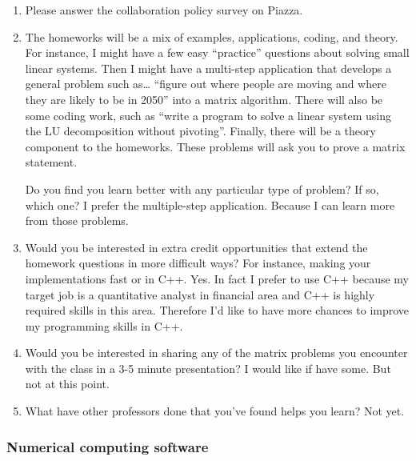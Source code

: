 \documentclass{article}
\begin{document}
\begin{enumerate}%
\item Please answer the collaboration policy survey on Piazza.


\item The homeworks will be a mix of examples, applications, coding, and theory. For instance, I might have a few easy ``{}practice''{} questions about solving small linear systems. Then I might have a multi-step application that develops a general problem such as\ldots{} ``{}figure out where people are moving and where they are likely to be in 2050''{} into a matrix algorithm. There will also be some coding work, such as ``{}write a program to solve a linear system using the LU decomposition without pivoting''{}. Finally, there will be a theory component to the homeworks. These problems will ask you to prove a matrix statement.

Do you find you learn better with any particular type of problem? If so, which one?
I prefer the multiple-step application. Because I can learn more from those problems. 

\item Would you be interested in extra credit opportunities that extend the homework questions in more difficult ways? For instance, making your implementations fast or in C++.
Yes.  In fact I prefer to use C++ because my target job is a quantitative analyst in financial area and C++ is highly required skills in this area.  Therefore I'd like to have more chances to improve my programming skills in C++. 



\item Would you be interested in sharing any of the matrix problems you encounter with the class in a 3-5 minute presentation?
I would like if have some. But not at this point. 


\item What have other professors done that you'{}ve found helps you learn?
Not yet. 


\end{enumerate}
\hypertarget{numerical_computing_software_3}{}\subsubsection*{{Numerical computing software}}\label{numerical_computing_software_3}
\end{document}
